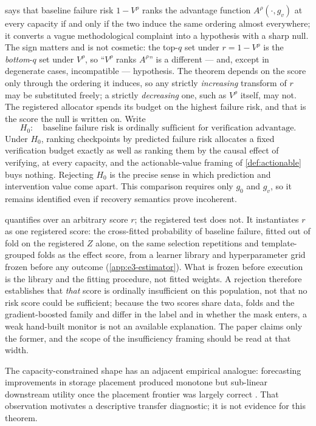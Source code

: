  says that baseline failure risk $1-V^\rho$ ranks the
advantage function $A^\rho(\cdot,g_v)$ at every capacity if and only if the two
induce the same ordering almost everywhere; it converts a vague methodological
complaint into a hypothesis with a sharp null.  The sign matters and is not
cosmetic: the top-$q$ set under $r=1-V^\rho$ is the \emph{bottom}-$q$ set under
$V^\rho$, so ``$V^\rho$ ranks $A^\rho$'' is a different --- and, except in
degenerate cases, incompatible --- hypothesis.  The theorem depends on the score
only through the ordering it induces, so any strictly \emph{increasing}
transform of $r$ may be substituted freely; a strictly \emph{decreasing} one,
such as $V^\rho$ itself, may not.  The registered allocator spends its budget on
the highest failure risk, and that is the score the null is written on.  Write
\begin{equation}
 H_0:\quad\text{baseline failure risk is ordinally sufficient for verification advantage.}
 \label{eq:null}
\end{equation}
Under $H_0$, ranking checkpoints by predicted failure risk allocates a fixed
verification budget exactly as well as ranking them by the causal effect of
verifying, at every capacity, and the actionable-value framing of
\cref{def:actionable} buys nothing.  Rejecting $H_0$ is the precise sense in
which prediction and intervention value come apart.  This comparison requires
only $g_0$ and $g_v$, so it remains identified even if recovery semantics prove
incoherent.

 quantifies over an arbitrary score $r$; the registered test
does not.  It instantiates $r$ as one registered score: the cross-fitted
probability of baseline failure, fitted out of fold on the registered $Z$ alone,
on the same selection repetitions and template-grouped folds as the effect score,
from a learner library and hyperparameter grid frozen before any outcome
(\cref{app:e3-estimator}).  What is frozen before execution is the library and
the fitting procedure, not fitted weights.  A rejection therefore establishes
that \emph{that} score is ordinally insufficient on this population, not that no
risk score could be sufficient; because the two scores share data, folds and the
gradient-boosted family and differ in the label and in whether the mask enters, a
weak hand-built monitor is not an available explanation.  The paper claims only the former, and the scope of the
insufficiency framing should be read at that width.

The capacity-constrained shape has an adjacent empirical analogue: forecasting
improvements in storage placement produced monotone but sub-linear downstream
utility once the placement frontier was largely correct \citep{fleda2026}.
That observation motivates a descriptive transfer diagnostic; it is not
evidence for this theorem.


